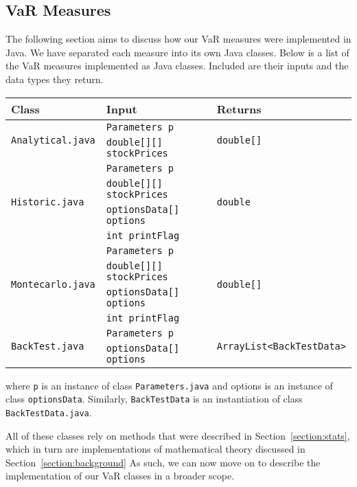 \documentclass[../Dissertation.tex]{subfiles}
\begin{document}
\subsection{VaR Measures}

The following section aims to discuss how our VaR measures were implemented in Java.
We have separated each measure into its own Java classes.
Below is a list of the VaR measures implemented as Java classes.
Included are their inputs and the data types they return.

\begin{center}
\begin{tabular}{||l | l | l ||} 
\hline
Class & Input &  Returns \\ [0.5ex] 
\hline\hline
\multirow{2}{6em}{\lstinline|Analytical.java|} & \lstinline|Parameters p| & \multirow{2}{12em}{\lstinline|double[]|}\\ 
&  \lstinline|double[][] stockPrices| & \\
\hline
\multirow{4}{6em}{\lstinline|Historic.java|} & \lstinline|Parameters p| & \multirow{4}{12em}{\lstinline|double|}\\
& \lstinline|double[][] stockPrices| & \\
& \lstinline|optionsData[] options| & \\
& \lstinline|int printFlag| & \\
\hline
\multirow{4}{6em}{\lstinline|Montecarlo.java|} & \lstinline|Parameters p| & \multirow{4}{12em}{\lstinline|double[]|}\\
& \lstinline|double[][] stockPrices| & \\
& \lstinline|optionsData[] options| & \\
& \lstinline|int printFlag| & \\
\hline
\multirow{2}{6em}{\lstinline|BackTest.java|} & \lstinline|Parameters p| & \multirow{2}{12em}{\lstinline|ArrayList<BackTestData>|}\\ 
&  \lstinline|optionsData[] options| & \\
\hline
\end{tabular}
\end{center}
where \lstinline|p| is an instance of class \lstinline|Parameters.java| and options is an instance of class \lstinline|optionsData|.
Similarly, \lstinline|BackTestData| is an instantiation of class \lstinline|BackTestData.java|.

All of these classes rely on methods that were described in Section~\ref{section:stats}, which in turn are implementations of mathematical theory discussed in Section~\ref{section:background}
As such, we can now move on to describe the implementation of our VaR classes in a broader scope.
\end{document}
